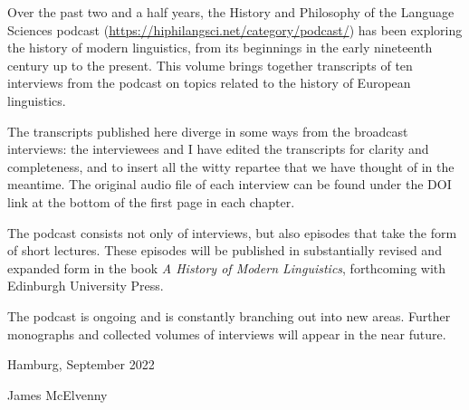 \addchap{\lsPrefaceTitle} 

Over the past two and a half years, the History and Philosophy of the Language Sciences podcast (\url{https://hiphilangsci.net/category/podcast/}) has been exploring the history of modern linguistics, from its beginnings in the early nineteenth century up to the present. This volume brings together transcripts of ten interviews from the podcast on topics related to the history of European linguistics. 

The transcripts published here diverge in some ways from the broadcast interviews: the interviewees and I have edited the transcripts for clarity and completeness, and to insert all the witty repartee that we have thought of in the meantime. The original audio file of each interview can be found under the DOI link at the bottom of the first page in each chapter.

The podcast consists not only of interviews, but also episodes that take the form of short lectures. These episodes will be published in substantially revised and expanded form in the book \textit{A History of Modern Linguistics}, forthcoming with Edinburgh University Press.

The podcast is ongoing and is constantly branching out into new areas. Further monographs and collected volumes of interviews will appear in the near future.\bigskip\\
\begin{minipage}{.5\linewidth}
	\begin{flushleft}
		\noindent Hamburg, September 2022  
	\end{flushleft}
\end{minipage}%
\begin{minipage}{.5\linewidth}
	\begin{flushright}
		James McElvenny
	\end{flushright}
\end{minipage}                

